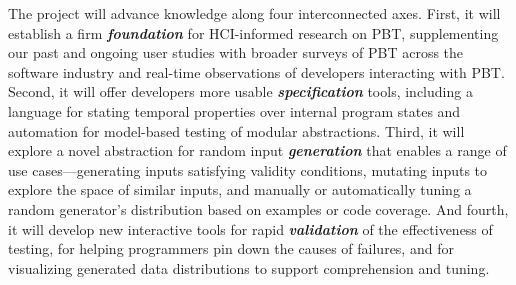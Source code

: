 The project will advance knowledge along four interconnected axes.
%
First, it will establish a firm {\bf\em foundation} for HCI-informed
research on PBT, supplementing our past and ongoing user studies with
broader surveys of PBT across the software industry and real-time
observations of developers interacting with PBT.
%
Second, it will offer developers more usable {\bf\em specification} tools,
including a language for stating temporal properties over internal
program states and automation for model-based testing of
modular abstractions.
%
Third, it will explore a novel abstraction for random input {\bf\em
  generation} that enables a range of use cases---generating inputs
satisfying validity conditions, mutating inputs to explore the space
of similar inputs, and manually or automatically tuning a random
generator's distribution based on examples or code coverage.
%
And fourth, it will develop new interactive tools for rapid {\bf\em
  validation} of the effectiveness of testing, for helping programmers pin
down the causes of failures, and for visualizing generated data
distributions to support comprehension and tuning.



